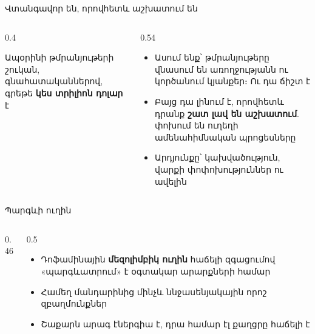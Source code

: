 \begin{frame}{Վտանգավոր են, որովհետև աշխատում են}
  \begin{columns}[c]
    \begin{column}{0.4\textwidth}
      \begin{card}[colback=butter!45!cream]
        \centering{}\par\smallskip
        Ապօրինի թմրանյութերի շուկան, գնահատականներով, գրեթե \textbf{կես տրիլիոն դոլար} է
      \end{card}
    \end{column}
    \begin{column}{0.54\textwidth}
      \begin{itemize}
        \item Ասում ենք՝ թմրանյութերը վնասում են առողջությանն ու կործանում կյանքեր։ Ու դա ճիշտ է
        \item<2-> Բայց դա լինում է, որովհետև դրանք \textbf{շատ լավ են աշխատում}. փոխում են ուղեղի ամենահիմնական պրոցեսները
        \item<3-> Արդյունքը՝ կախվածություն, վարքի փոփոխություններ ու ավելին
      \end{itemize}
    \end{column}
  \end{columns}
\end{frame}

\begin{frame}{Պարգևի ուղին}
  \begin{columns}[c]
    \begin{column}{0.46\textwidth}
      \centering
      
    \end{column}
    \begin{column}{0.5\textwidth}
      \begin{itemize}
        \item Դոֆամինային \textbf{մեզոլիմբիկ ուղին} հաճելի զգացումով «պարգևատրում» է օգտակար արարքների համար
        \item Համեղ մանդարինից մինչև ննջասենյակային որոշ զբաղմունքներ
        \item Շաքարն արագ էներգիա է, դրա համար էլ քաղցրը հաճելի է
      \end{itemize}
    \end{column}
  \end{columns}
\end{frame}

